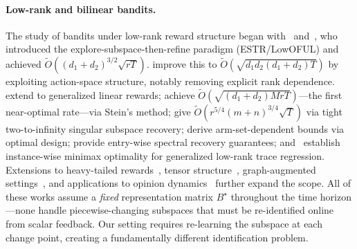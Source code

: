 \documentclass[11pt]{article}
\begin{document}
\paragraph{Low-rank and bilinear bandits.}
The study of bandits under low-rank reward structure began
with~\citet{kveton2017stochastic} and~\citet{jun2019bilinear}, who introduced the
explore-subspace-then-refine paradigm (ESTR/LowOFUL)
and achieved $\widetilde{O}((d_1{+}d_2)^{3/2}\sqrt{rT})$.
\citet{jang2021improved} improve this to $\widetilde{O}(\sqrt{d_1 d_2(d_1{+}d_2)T})$
by exploiting action-space structure, notably removing explicit rank dependence.
\citet{lu2021lowrank} extend to generalized linear rewards;
\citet{kang2022gestt} achieve $\widetilde{O}(\sqrt{(d_1{+}d_2)MrT})$---the
first near-optimal rate---via Stein's method;
\citet{pmlr-v235-jedra24a} give
$\widetilde{O}(r^{5/4}(m{+}n)^{3/4}\sqrt{T})$ via tight two-to-infinity
singular subspace recovery;
\citet{pmlr-v235-jang24e} derive arm-set-dependent bounds via optimal design;
\citet{stojanovic2023spectral} provide entry-wise spectral recovery guarantees;
and~\citet{lee2026gllowpopart} establish instance-wise minimax optimality for
generalized low-rank trace regression.
Extensions to heavy-tailed rewards~\citep{kang2024heavy},
tensor structure~\citep{stojanovic2024loraPI},
graph-augmented settings~\citep{wang2025graph},
and applications to opinion dynamics~\citep{cinus2025polarization} further
expand the scope.
All of these works assume a \emph{fixed} representation matrix $B^\star$
throughout the time horizon---none handle piecewise-changing subspaces
that must be re-identified online from scalar feedback.
Our setting requires re-learning the subspace at each change point,
creating a fundamentally different identification problem.
\end{document}
